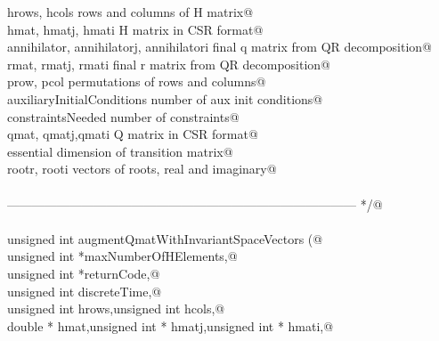 \documentclass[12pt]{article}
\begin{document}
\begin{flushleft}
\begin{minipage}{\linewidth}
\begin{list}{}{}
\mbox{}\verb@                hrows, hcols                                                            rows and columns of H matrix@\\
\mbox{}\verb@                hmat, hmatj, hmati                                                      H matrix in CSR format@\\
\mbox{}\verb@                annihilator, annihilatorj, annihilatori         final q matrix from QR decomposition@\\
\mbox{}\verb@                rmat, rmatj, rmati                                                      final r matrix from QR decomposition@\\
\mbox{}\verb@                prow, pcol                                                                      permutations of rows and columns@\\
\mbox{}\verb@                auxiliaryInitialConditions                                      number of aux init conditions@\\
\mbox{}\verb@                constraintsNeeded                                                       number of constraints@\\
\mbox{}\verb@                qmat, qmatj,qmati                                                       Q matrix in CSR format@\\
\mbox{}\verb@                essential                                                                       dimension of transition matrix@\\
\mbox{}\verb@                rootr, rooti                                                            vectors of roots, real and imaginary@\\
\mbox{}\verb@@\\
\mbox{}\verb@------------------------------------------------------------------------------------ */@\\
\mbox{}\verb@@\\
\mbox{}\verb@static unsigned int augmentQmatWithInvariantSpaceVectors (@\\
\mbox{}\verb@        unsigned int *maxNumberOfHElements,@\\
\mbox{}\verb@        unsigned int *returnCode,@\\
\mbox{}\verb@        unsigned int discreteTime,@\\
\mbox{}\verb@        unsigned int hrows,unsigned int hcols,@\\
\mbox{}\verb@        double * hmat,unsigned int * hmatj,unsigned int * hmati,@\\

\end{list}
\end{minipage}
\end{flushleft}
\end{document}
